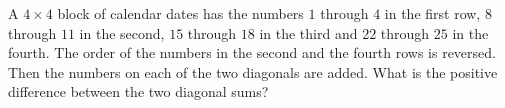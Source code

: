 A $4\times4$ block of calendar dates has the numbers $1$ through $4$ in the first row, $8$ through $11$ in the second, $15$ through $18$ in the third and $22$ through $25$ in the fourth. The order of the numbers in the second and the fourth rows is reversed. Then the numbers on each of the two diagonals are added. What is the positive difference between the two diagonal sums?
